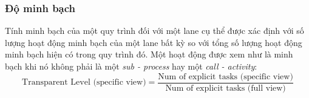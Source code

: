 \subsubsection{Độ minh bạch}
Tính minh bạch của một quy trình đối với một lane cụ thể được xác định với số lượng hoạt động minh bạch của một lane bất kỳ so với tổng số lượng hoạt động minh bạch hiện có trong quy trình đó. Một hoạt động được xem như là minh bạch khi nó không phải là một \emph{sub - process} hay một \emph{call - activity}:
\[ \text{Transparent Level (specific view)}  = \frac{\text{Num of explicit tasks (specific view)} }{\text{Num of explicit tasks (full view)}}\]
